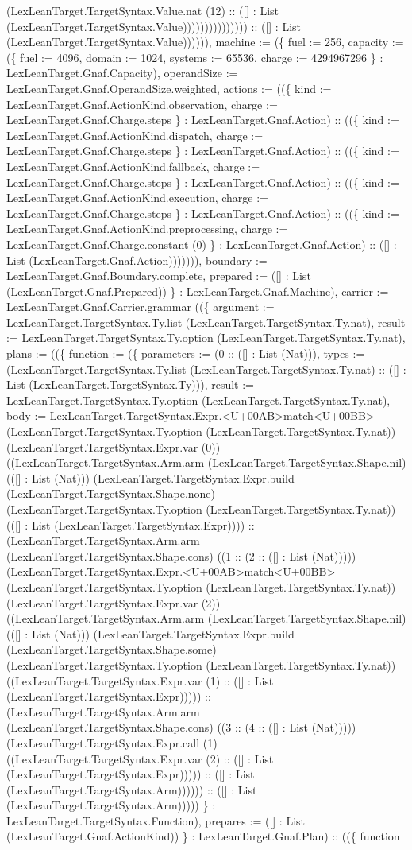 \documentclass[11pt]{article}
\begin{document}
(LexLeanTarget.TargetSyntax.Value.nat (12) :: ([] : List (LexLeanTarget.TargetSyntax.Value))))))))))))))) :: ([] : List (LexLeanTarget.TargetSyntax.Value)))))), machine := (\{ fuel := 256, capacity := (\{ fuel := 4096, domain := 1024, systems := 65536, charge := 4294967296 \} : LexLeanTarget.Gnaf.Capacity), operandSize := LexLeanTarget.Gnaf.OperandSize.weighted, actions := ((\{ kind := LexLeanTarget.Gnaf.ActionKind.observation, charge := LexLeanTarget.Gnaf.Charge.steps \} : LexLeanTarget.Gnaf.Action) :: ((\{ kind := LexLeanTarget.Gnaf.ActionKind.dispatch, charge := LexLeanTarget.Gnaf.Charge.steps \} : LexLeanTarget.Gnaf.Action) :: ((\{ kind := LexLeanTarget.Gnaf.ActionKind.fallback, charge := LexLeanTarget.Gnaf.Charge.steps \} : LexLeanTarget.Gnaf.Action) :: ((\{ kind := LexLeanTarget.Gnaf.ActionKind.execution, charge := LexLeanTarget.Gnaf.Charge.steps \} : LexLeanTarget.Gnaf.Action) :: ((\{ kind := LexLeanTarget.Gnaf.ActionKind.preprocessing, charge := LexLeanTarget.Gnaf.Charge.constant (0) \} : LexLeanTarget.Gnaf.Action) :: ([] : List (LexLeanTarget.Gnaf.Action))))))), boundary := LexLeanTarget.Gnaf.Boundary.complete, prepared := ([] : List (LexLeanTarget.Gnaf.Prepared)) \} : LexLeanTarget.Gnaf.Machine), carrier := LexLeanTarget.Gnaf.Carrier.grammar ((\{ argument := LexLeanTarget.TargetSyntax.Ty.list (LexLeanTarget.TargetSyntax.Ty.nat), result := LexLeanTarget.TargetSyntax.Ty.option (LexLeanTarget.TargetSyntax.Ty.nat), plans := ((\{ function := (\{ parameters := (0 :: ([] : List (Nat))), types := (LexLeanTarget.TargetSyntax.Ty.list (LexLeanTarget.TargetSyntax.Ty.nat) :: ([] : List (LexLeanTarget.TargetSyntax.Ty))), result := LexLeanTarget.TargetSyntax.Ty.option (LexLeanTarget.TargetSyntax.Ty.nat), body := LexLeanTarget.TargetSyntax.Expr.<U+00AB>match<U+00BB> (LexLeanTarget.TargetSyntax.Ty.option (LexLeanTarget.TargetSyntax.Ty.nat)) (LexLeanTarget.TargetSyntax.Expr.var (0)) ((LexLeanTarget.TargetSyntax.Arm.arm (LexLeanTarget.TargetSyntax.Shape.nil) (([] : List (Nat))) (LexLeanTarget.TargetSyntax.Expr.build (LexLeanTarget.TargetSyntax.Shape.none) (LexLeanTarget.TargetSyntax.Ty.option (LexLeanTarget.TargetSyntax.Ty.nat)) (([] : List (LexLeanTarget.TargetSyntax.Expr)))) :: (LexLeanTarget.TargetSyntax.Arm.arm (LexLeanTarget.TargetSyntax.Shape.cons) ((1 :: (2 :: ([] : List (Nat))))) (LexLeanTarget.TargetSyntax.Expr.<U+00AB>match<U+00BB> (LexLeanTarget.TargetSyntax.Ty.option (LexLeanTarget.TargetSyntax.Ty.nat)) (LexLeanTarget.TargetSyntax.Expr.var (2)) ((LexLeanTarget.TargetSyntax.Arm.arm (LexLeanTarget.TargetSyntax.Shape.nil) (([] : List (Nat))) (LexLeanTarget.TargetSyntax.Expr.build (LexLeanTarget.TargetSyntax.Shape.some) (LexLeanTarget.TargetSyntax.Ty.option (LexLeanTarget.TargetSyntax.Ty.nat)) ((LexLeanTarget.TargetSyntax.Expr.var (1) :: ([] : List (LexLeanTarget.TargetSyntax.Expr))))) :: (LexLeanTarget.TargetSyntax.Arm.arm (LexLeanTarget.TargetSyntax.Shape.cons) ((3 :: (4 :: ([] : List (Nat))))) (LexLeanTarget.TargetSyntax.Expr.call (1) ((LexLeanTarget.TargetSyntax.Expr.var (2) :: ([] : List (LexLeanTarget.TargetSyntax.Expr))))) :: ([] : List (LexLeanTarget.TargetSyntax.Arm)))))) :: ([] : List (LexLeanTarget.TargetSyntax.Arm))))) \} : LexLeanTarget.TargetSyntax.Function), prepares := ([] : List (LexLeanTarget.Gnaf.ActionKind)) \} : LexLeanTarget.Gnaf.Plan) :: ((\{ function 
\end{document}
